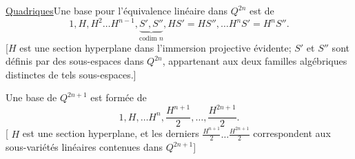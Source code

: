 \uline{Quadriques}\quad Une base pour l'équivalence linéaire dans
$Q^{2n}$ est  de
\[
1,H,H^2\ldots H^{n-1},
\underbrace{S',S''}_{\text{codim }n},
HS'=HS'',\ldots H^nS'=H^nS''.
\]
[$H$ est une section hyperplane dans l'immersion projective évidente;
$S'$ et $S''$ sont définis par des sous-espaces
dans $Q^{2n}$, appartenant aux deux familles algébriques distinctes
de tels sous-espaces.]

Une base de $Q^{2n+1}$ est formée de
\[
1,H,\ldots H^n,\frac{H^{n+1}}2,\ldots,\frac{H^{2n+1}}2.
\]
[ $H$ est une section hyperplane, et  les derniers
$\frac{H^{n+1}}2\ldots\frac{H^{2n+1}}2$ correspondent aux sous-variétés
linéaires contenues dans $Q^{2n+1}$]
